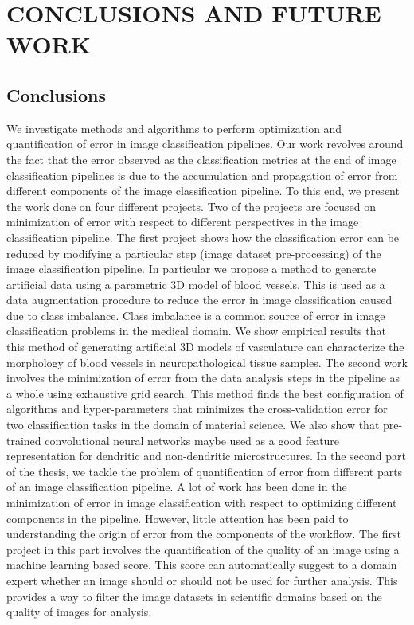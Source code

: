 \chapter{CONCLUSIONS AND FUTURE WORK}
\label{chap:conclusions}
\section{Conclusions}
We investigate methods and algorithms to perform optimization and quantification of error in image classification pipelines. Our work revolves around the fact that the error observed as the classification metrics at the end of image classification pipelines is due to the accumulation and propagation of error from different components of the image classification pipeline. To this end, we present the work done on four different projects. Two of the projects are focused on minimization of error with respect to different perspectives in the image classification pipeline. 
The first project shows how the classification error can be reduced by modifying a particular step (image dataset pre-processing) of the image classification pipeline. In particular we propose a method to generate artificial data using a parametric 3D model of blood vessels. This is used as a data augmentation procedure to reduce the error in image classification caused due to class imbalance. Class imbalance is a common source of error in image classification problems in the medical domain. We show empirical results that this method of generating artificial 3D models of vasculature can characterize the morphology of blood vessels in neuropathological tissue samples.  
The second work involves the minimization of error from the data analysis steps in the pipeline as a whole using exhaustive grid search. This method finds the best configuration of algorithms and hyper-parameters that minimizes the cross-validation error for two classification tasks in the domain of material science. We also show that pre-trained convolutional neural networks maybe used  as a good feature representation for dendritic and non-dendritic microstructures. 
In the second part of the thesis, we tackle the problem of quantification of error from different parts of an image classification pipeline. A lot of work has been done in the minimization of error in image classification with respect to optimizing different components in the pipeline. However, little attention has been paid to understanding the origin of error from the components of the workflow. 
The first project in this part involves the quantification of the quality of an image using a machine learning based score. This score can automatically suggest to a domain expert whether an image should or should not be used for further analysis. This provides a way to filter the image datasets in scientific domains based on the quality of images for analysis.
